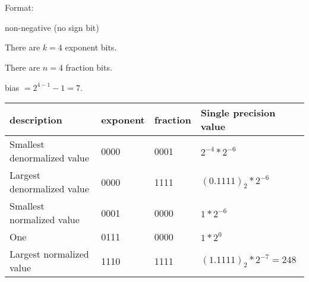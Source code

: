 \documentclass[letterpaper, 11pt]{article}
\theoremstyle{mystyle}
\begin{document}
\section{}
Format:
\begin{compactitem}
    \item non-negative (no sign bit)
    \item There are $k=4$ exponent bits.
    \item There are $n=4$ fraction bits.
    \item bias $= 2^{4-1}-1 = 7 $.
\end{compactitem}

\begin{tabular}{M|M|M|M}
    \hline
    description                     & exponent  & fraction  & Single precision value \\ \hline
    Smallest denormalized value     & 0000      & 0001      & $2^{-4} * 2^{-6}$      \\
    Largest denormalized value      & 0000      & 1111      & $(0.1111)_2 * 2^{-6}$  \\
    Smallest normalized value       & 0001      & 0000      & $1 * 2^{-6}$           \\
    One                             & 0111      & 0000      & $1*2^0$                \\
    Largest normalized value        & 1110      & 1111      & $(1.1111)_2 * 2^{-7} = 248$  \\
\end{tabular}
\end{document}
